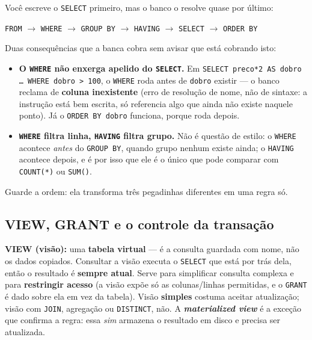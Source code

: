 \begin{conceito}
Você escreve o \texttt{SELECT} primeiro, mas o banco o resolve quase por
último:

\begin{center}
\texttt{FROM} $\to$ \texttt{WHERE} $\to$ \texttt{GROUP BY} $\to$
\texttt{HAVING} $\to$ \texttt{SELECT} $\to$ \texttt{ORDER BY}
\end{center}

Duas consequências que a banca cobra sem avisar que está cobrando isto:

\begin{itemize}
\item \textbf{O \texttt{WHERE} não enxerga apelido do \texttt{SELECT}.} Em
\texttt{SELECT preco*2 AS dobro \ldots\ WHERE dobro > 100}, o \texttt{WHERE}
roda antes de \texttt{dobro} existir --- o banco reclama de \textbf{coluna
inexistente} (erro de resolução de nome, não de sintaxe: a instrução está bem
escrita, só referencia algo que ainda não existe naquele ponto). Já o
\texttt{ORDER BY dobro} funciona, porque roda depois.
\item \textbf{\texttt{WHERE} filtra linha, \texttt{HAVING} filtra grupo.} Não
é questão de estilo: o \texttt{WHERE} acontece \emph{antes} do \texttt{GROUP
BY}, quando grupo nenhum existe ainda; o \texttt{HAVING} acontece depois, e é
por isso que ele é o único que pode comparar com \texttt{COUNT(*)} ou
\texttt{SUM()}.
\end{itemize}

Guarde a ordem: ela transforma três pegadinhas diferentes em uma regra só.
\end{conceito}

\subsection{VIEW, GRANT e o controle da transação}

\textbf{VIEW (visão):} uma \textbf{tabela virtual} --- é a consulta guardada
com nome, não os dados copiados. Consultar a visão executa o \texttt{SELECT}
que está por trás dela, então o resultado é \textbf{sempre atual}. Serve para
simplificar consulta complexa e para \textbf{restringir acesso} (a visão expõe
só as colunas/linhas permitidas, e o \texttt{GRANT} é dado sobre ela em vez da
tabela). Visão \textbf{simples} costuma aceitar atualização; visão com
\texttt{JOIN}, agregação ou \texttt{DISTINCT}, não. A
\textbf{\emph{materialized view}} é a exceção que confirma a regra: essa
\emph{sim} armazena o resultado em disco e precisa ser atualizada.


